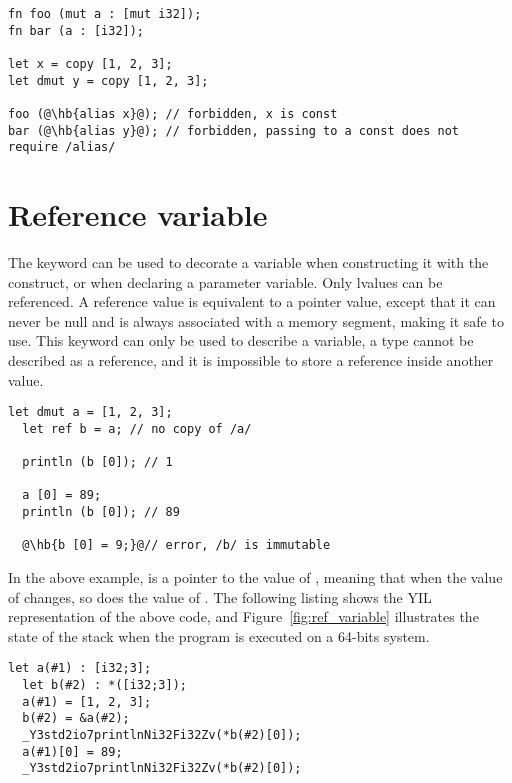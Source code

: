 \begin{lstlisting}[style=coloredverbatim, escapechar=@]
fn foo (mut a : [mut i32]);
fn bar (a : [i32]);

let x = copy [1, 2, 3];
let dmut y = copy [1, 2, 3];

foo (@\hb{alias x}@); // forbidden, x is const
bar (@\hb{alias y}@); // forbidden, passing to a const does not require /alias/
\end{lstlisting}

\vfill%
\pagebreak

\section {Reference variable}
\label{sec:ref_variable}

The  keyword can be used to decorate a variable when constructing it
with the  construct, or when declaring a parameter variable. Only
lvalues can be referenced. A reference value is equivalent to a pointer value,
except that it can never be null and is always associated with a memory segment,
making it safe to use. This keyword can only be used to describe a variable, a
type cannot be described as a reference, and it is impossible to store a
reference inside another value.

\begin{lstlisting}[style=coloredverbatim, escapechar=@]
  let dmut a = [1, 2, 3];
  let ref b = a; // no copy of /a/

  println (b [0]); // 1

  a [0] = 89;
  println (b [0]); // 89

  @\hb{b [0] = 9;}@// error, /b/ is immutable
\end{lstlisting}

In the above example,  is a pointer to the value of ,
meaning that when the value of  changes, so does the value of
. The following listing shows the YIL representation of the above
code, and Figure~\ref{fig:ref_variable} illustrates the state of the stack when the
program is executed on a 64-bits system.

\begin{lstlisting}[style=lyilVerb]
  let a(#1) : [i32;3];
  let b(#2) : *([i32;3]);
  a(#1) = [1, 2, 3];
  b(#2) = &a(#2);
  _Y3std2io7printlnNi32Fi32Zv(*b(#2)[0]);
  a(#1)[0] = 89;
  _Y3std2io7printlnNi32Fi32Zv(*b(#2)[0]);
\end{lstlisting}



